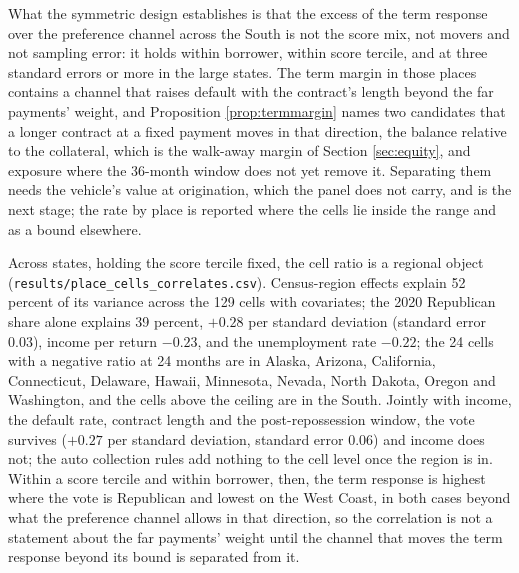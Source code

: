 What the symmetric design establishes is that the excess of the term response over the preference channel across the South is not the score mix, not movers and not sampling error: it holds within borrower, within score tercile, and at three standard errors or more in the large states. The term margin in those places contains a channel that raises default with the contract's length beyond the far payments' weight, and Proposition \ref{prop:termmargin} names two candidates that a longer contract at a fixed payment moves in that direction, the balance relative to the collateral, which is the walk-away margin of Section \ref{sec:equity}, and exposure where the 36-month window does not yet remove it. Separating them needs the vehicle's value at origination, which the panel does not carry, and is the next stage; the rate by place is reported where the cells lie inside the range and as a bound elsewhere.

Across states, holding the score tercile fixed, the cell ratio is a regional object (\texttt{results/place\_cells\_correlates.csv}). Census-region effects explain 52 percent of its variance across the 129 cells with covariates; the 2020 Republican share alone explains 39 percent, $+0.28$ per standard deviation (standard error $0.03$), income per return $-0.23$, and the unemployment rate $-0.22$; the 24 cells with a negative ratio at 24 months are in Alaska, Arizona, California, Connecticut, Delaware, Hawaii, Minnesota, Nevada, North Dakota, Oregon and Washington, and the cells above the ceiling are in the South. Jointly with income, the default rate, contract length and the post-repossession window, the vote survives ($+0.27$ per standard deviation, standard error $0.06$) and income does not; the auto collection rules add nothing to the cell level once the region is in. Within a score tercile and within borrower, then, the term response is highest where the vote is Republican and lowest on the West Coast, in both cases beyond what the preference channel allows in that direction, so the correlation is not a statement about the far payments' weight until the channel that moves the term response beyond its bound is separated from it.


